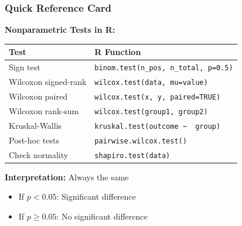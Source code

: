 \documentclass{beamer}
\begin{document}
\begin{frame}
\frametitle{Quick Reference Card}

\textbf{Nonparametric Tests in R:}

\vspace{0.3cm}
\begin{small}
\begin{tabular}{ll}
\toprule
\textbf{Test} & \textbf{R Function} \\
\midrule
Sign test & \texttt{binom.test(n\_pos, n\_total, p=0.5)} \\
Wilcoxon signed-rank & \texttt{wilcox.test(data, mu=value)} \\
Wilcoxon paired & \texttt{wilcox.test(x, y, paired=TRUE)} \\
Wilcoxon rank-sum & \texttt{wilcox.test(group1, group2)} \\
Kruskal-Wallis & \texttt{kruskal.test(outcome \textasciitilde~ group)} \\
Post-hoc tests & \texttt{pairwise.wilcox.test()} \\
Check normality & \texttt{shapiro.test(data)} \\
\bottomrule
\end{tabular}
\end{small}

\vspace{0.5cm}
\textbf{Interpretation:} Always the same
\begin{itemize}
\item If $p < 0.05$: Significant difference
\item If $p \geq 0.05$: No significant difference
\end{itemize}
\end{frame}
\end{document}

